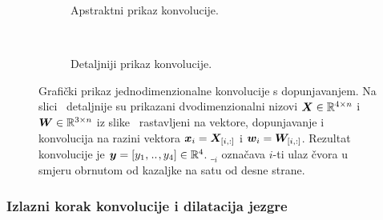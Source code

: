 \documentclass[utf8, diplomski, lmodern]{fer}
\begin{document}
\begin{figure}
\centering
\begin{subfigure}[t]{0.48\textwidth}
	\centering
	\caption{Apstraktni prikaz konvolucije.}
	\label{subfig:konv-aps}
\end{subfigure}
~
\begin{subfigure}[t]{0.48\textwidth}
	\centering
	\caption{Detaljniji prikaz konvolucije.}
\label{subfig:konv-det}
\end{subfigure}
	\caption{Grafički prikaz jednodimenzionalne konvolucije s dopunjavanjem. Na slici~ detaljnije su prikazani dvodimenzionalni nizovi $\vec X\in\R^{4\times n}$ i $\vec W\in\R^{3\times n}$ iz slike~ rastavljeni na vektore, dopunjavanje i konvolucija na razini vektora $\vec x_i=\vec X_\ind{i,:}$ i $\vec w_i=\vec W_\ind{i,:}$. Rezultat konvolucije je $\vec y=\sbr{y_1,\bidot,y_4}\in\R^4$. $\__i$ označava $i$-ti ulaz čvora u smjeru obrnutom od kazaljke na satu od desne strane.}
	\label{fig:konvolucija-grafovi}
\end{figure}

\subsubsection{Izlazni korak konvolucije i dilatacija jezgre}
\end{document}
